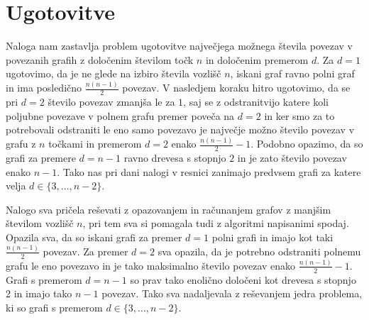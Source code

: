 \documentclass[12pt,a4paper]{amsart}
\theoremstyle{definition} %
\theoremstyle{plain} %
\begin{document}
\section{Ugotovitve}
Naloga nam zastavlja problem ugotovitve največjega možnega števila povezav v povezanih grafih
z določenim številom točk $n$ in določenim premerom $d$. Za $d = 1$ ugotovimo, da je ne glede
na izbiro števila vozlišč $n$, iskani graf ravno polni graf in ima posledično
$\frac{n (n - 1)}{2}$ povezav. V nasledjem koraku hitro ugotovimo, da se pri $d = 2$ število
povezav zmanjša le za $1$, saj se z odstranitvijo katere koli poljubne povezave v polnem grafu
premer poveča na $d = 2$ in ker smo za to potrebovali odstraniti le eno samo povezavo je največje
možno število povezav v grafu z $n$ točkami in premerom $d = 2$ enako $\frac{n (n - 1)}{2} - 1$.
Podobno opazimo, da so grafi za premere $d = n - 1$ ravno drevesa s stopnjo $2$ in je zato število
povezav enako $n - 1$. Tako nas pri dani nalogi v resnici zanimajo predvsem grafi za katere velja
$d \in \{3, \dots, n - 2\}$.

Nalogo sva pričela reševati z opazovanjem in računanjem grafov z manjšim številom vozlišč $n$, pri tem sva si
pomagala tudi z algoritmi napisanimi spodaj. Opazila sva, da so iskani grafi za premer $d = 1$ polni grafi in
imajo kot taki $\frac{n (n - 1)}{2}$ povezav. Za premer $d = 2$ sva opazila, da je potrebno odstraniti
polnemu grafu le eno povezavo in je tako maksimalno število povezav enako $\frac{n (n - 1)}{2} - 1$. Grafi s
premerom $d = n - 1$ so prav tako enolično določeni kot drevesa s stopnjo 2 in imajo tako $n - 1$ povezav.
Tako sva nadaljevala z reševanjem jedra problema, ki so grafi s premerom $d \in \{3, \dots, n - 2\}$.\\
\end{document}
